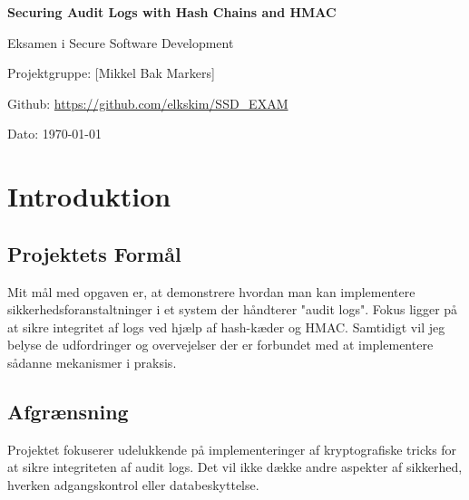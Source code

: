\documentclass[12pt, a4paper, danish]{article}
\begin{document}
\begin{titlepage}
    \centering
    \vspace*{\fill}
    
    \Large
    \textbf{Securing Audit Logs with Hash Chains and HMAC}
    
    \vspace{0.5cm}
    Eksamen i Secure Software Development
    
    \vspace{2cm}
    \normalsize
    Projektgruppe: [Mikkel Bak Markers]

    \vspace{0.3cm}
    Github: \url{https://github.com/elkskim/SSD_EXAM}
    
    \vspace{0.3cm}
    Dato: \today
    
    \vspace*{\fill}
\end{titlepage}

\newpage
\tableofcontents

\newpage
\section{Introduktion}

\subsection{Projektets Formål}
Mit mål med opgaven er, at demonstrere hvordan man kan implementere 
sikkerhedsforanstaltninger i et system der håndterer "audit logs". Fokus ligger på at sikre integritet af logs ved hjælp af hash-kæder og HMAC.
Samtidigt vil jeg belyse de udfordringer og overvejelser der er forbundet med at implementere sådanne mekanismer i praksis.

\subsection{Afgrænsning}
Projektet fokuserer udelukkende på implementeringer af kryptografiske tricks for at sikre integriteten af audit logs.
Det vil ikke dække andre aspekter af sikkerhed, hverken adgangskontrol eller databeskyttelse.
\end{document}
